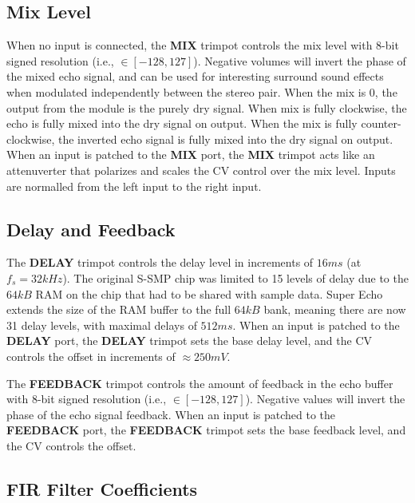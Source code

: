 \documentclass[12pt,letter]{article}
\begin{document}
\subsection{Mix Level}

When no input is connected, the \textbf{MIX} trimpot controls the mix level with 8-bit signed resolution (i.e., $\in [-128, 127]$). Negative volumes will invert the phase of the mixed echo signal, and can be used for interesting surround sound effects when modulated independently between the stereo pair. When the mix is 0, the output from the module is the purely dry signal. When mix is fully clockwise, the echo is fully mixed into the dry signal on output. When the mix is fully counter-clockwise, the inverted echo signal is fully mixed into the dry signal on output. When an input is patched to the \textbf{MIX} port, the \textbf{MIX} trimpot acts like an attenuverter that polarizes and scales the CV control over the mix level. Inputs are normalled from the left input to the right input.

\subsection{Delay and Feedback}

The \textbf{DELAY} trimpot controls the delay level in increments of $16ms$ (at $f_s = 32kHz$). The original S-SMP chip was limited to 15 levels of delay due to the $64kB$ RAM on the chip that had to be shared with sample data. Super Echo extends the size of the RAM buffer to the full $64kB$ bank, meaning there are now 31 delay levels, with maximal delays of $512ms$. When an input is patched to the \textbf{DELAY} port, the \textbf{DELAY} trimpot sets the base delay level, and the CV controls the offset in increments of $\approx250mV$.

The \textbf{FEEDBACK} trimpot controls the amount of feedback in the echo buffer with 8-bit signed resolution (i.e., $\in [-128, 127]$). Negative values will invert the phase of the echo signal feedback. When an input is patched to the \textbf{FEEDBACK} port, the \textbf{FEEDBACK} trimpot sets the base feedback level, and the CV controls the offset.

\subsection{FIR Filter Coefficients}
\end{document}
